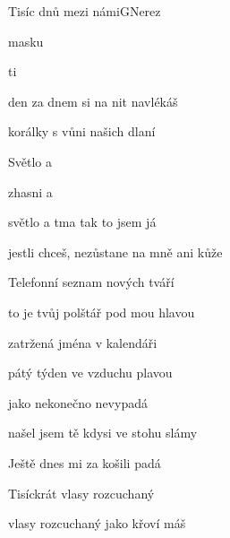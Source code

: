 \setcounter{page}{87}
\begin{song}{Tisíc dnů mezi námi}{G}{Nerez}

\begin{SBVerse}

  masku 

  ti 

den za dnem si na nit navlékáš

korálky s vůni našich dlaní

\end{SBVerse}

\begin{SBChorus*}

Světlo a  

zhasni a  

světlo a tma tak to jsem já

jestli chceš, nezůstane na mně ani kůže

\end{SBChorus*}

\begin{SBVerse}

Telefonní seznam nových tváří

to je tvůj polštář pod mou hlavou

zatržená jména v kalendáři

pátý týden ve vzduchu plavou

\end{SBVerse}

\begin{SBChorus*}

\end{SBChorus*}

\begin{SBChorus}

   

jako nekonečno nevypadá

našel jsem tě kdysi ve stohu slámy

Ještě dnes mi za košili padá

\end{SBChorus}

\begin{SBVerse}

Tisíckrát vlasy rozcuchaný

vlasy rozcuchaný jako křoví máš


\end{SBVerse}
\end{song}

